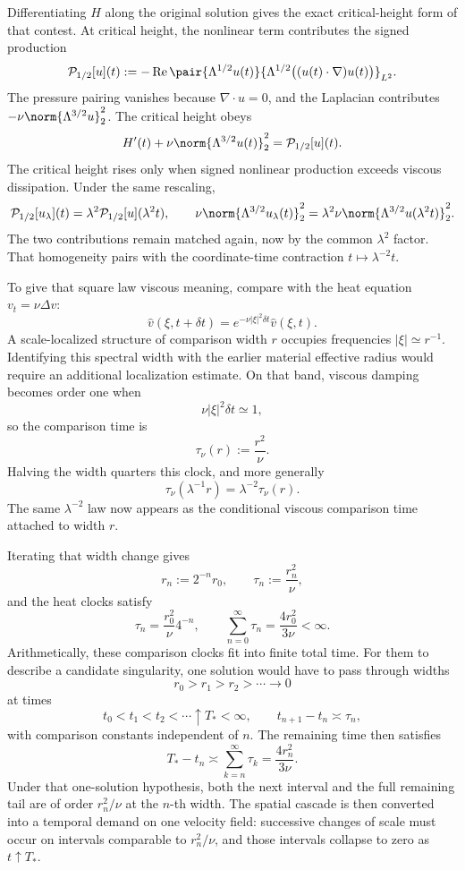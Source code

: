 
Differentiating \(H\) along the original solution gives the exact critical-height form of that contest. At critical height, the nonlinear term contributes the signed production
\[
  \mathcal P_{1/2}[u](t)
  :=
  -\operatorname{Re}
  \pair
    {\Lambda^{1/2}u(t)}
    {\Lambda^{1/2}\bigl((u(t)\cdot\nabla)u(t)\bigr)}_{L^2}.
\]
The pressure pairing vanishes because \(\nabla\cdot u=0\), and the Laplacian contributes \(-\nu\norm{\Lambda^{3/2}u}_2^2\). The critical height obeys
\[
  H'(t)
  +
  \nu\norm{\Lambda^{3/2}u(t)}_2^2
  =
  \mathcal P_{1/2}[u](t).
\]
The critical height rises only when signed nonlinear production exceeds viscous dissipation. Under the same rescaling,
\[
  \mathcal P_{1/2}[u_\lambda](t)
  =
  \lambda^2\mathcal P_{1/2}[u](\lambda^2t),
  \qquad
  \nu\norm{\Lambda^{3/2}u_\lambda(t)}_2^2
  =
  \lambda^2\nu\norm{\Lambda^{3/2}u(\lambda^2t)}_2^2.
\]
The two contributions remain matched again, now by the common \(\lambda^2\) factor. That homogeneity pairs with the coordinate-time contraction \(t\mapsto\lambda^{-2}t\).


To give that square law viscous meaning, compare with the heat equation \(v_t=\nu\Delta v\):
\[
  \widehat v(\xi,t+\delta t)
  =
  e^{-\nu|\xi|^2\delta t}\widehat v(\xi,t).
\]
A scale-localized structure of comparison width \(r\) occupies frequencies \(|\xi|\simeq r^{-1}\). Identifying this spectral width with the earlier material effective radius would require an additional localization estimate. On that band, viscous damping becomes order one when
\[
  \nu|\xi|^2\delta t\simeq1,
\]
so the comparison time is
\[
  \tau_\nu(r)
  :=
  \frac{r^2}{\nu}.
\]
Halving the width quarters this clock, and more generally
\[
  \tau_\nu(\lambda^{-1}r)
  =
  \lambda^{-2}\tau_\nu(r).
\]
The same \(\lambda^{-2}\) law now appears as the conditional viscous comparison time attached to width \(r\).


Iterating that width change gives
\[
  r_n:=2^{-n}r_0,
  \qquad
  \tau_n:=\frac{r_n^2}{\nu},
\]
and the heat clocks satisfy
\[
  \tau_n
  =
  \frac{r_0^2}{\nu}4^{-n},
  \qquad
  \sum_{n=0}^{\infty}\tau_n
  =
  \frac{4r_0^2}{3\nu}
  <
  \infty.
\]
Arithmetically, these comparison clocks fit into finite total time. For them to describe a candidate singularity, one \NavierStokes{} solution would have to pass through widths
\[
  r_0>r_1>r_2>\cdots\longrightarrow0
\]
at times
\[
  t_0<t_1<t_2<\cdots\uparrow T_*<\infty,
  \qquad
  t_{n+1}-t_n\asymp\tau_n,
\]
with comparison constants independent of \(n\). The remaining time then satisfies
\[
  T_*-t_n
  \asymp
  \sum_{k=n}^{\infty}\tau_k
  =
  \frac{4r_n^2}{3\nu}.
\]
Under that one-solution hypothesis, both the next interval and the full remaining tail are of order \(r_n^2/\nu\) at the \(n\)-th width. The spatial cascade is then converted into a temporal demand on one velocity field: successive changes of scale must occur on intervals comparable to \(r_n^2/\nu\), and those intervals collapse to zero as \(t\uparrow T_*\).
